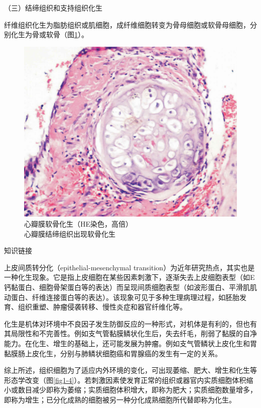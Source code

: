 {（三）结缔组织和支持组织化生}

纤维组织化生为脂肪组织或肌细胞，成纤维细胞转变为骨母细胞或软骨母细胞，分别化生为骨或软骨（图\ref{fig1-3}）。
\begin{figure}[!htbp]
	\centering
    \includegraphics{./images/Image00004.jpg}
	\caption{心瓣膜软骨化生（HE染色，高倍） \\ {\small 心瓣膜结缔组织出现软骨化生}}
	\label{fig1-3} 
	\end{figure} 

{知识链接}

上皮间质转分化（epithelial-mesenchymal
transition）为近年研究热点，其实也是一种化生现象。它是指上皮细胞在某些因素刺激下，逐渐失去上皮细胞表型（如E钙黏蛋白、细胞骨架蛋白等的表达）而呈现间质细胞表型（如波形蛋白、平滑肌肌动蛋白、纤维连接蛋白等的表达）。该现象可见于多种生理病理过程，如胚胎发育、组织重塑、肿瘤侵袭转移、慢性炎症和器官纤维化等。

化生是机体对环境中不良因子发生防御反应的一种形式，对机体是有利的，但也有其局限性和不完善性。例如支气管黏膜鳞状化生后，失去纤毛，削弱了黏膜的自净能力。在化生、增生的基础上，还可能发展为肿瘤。例如支气管鳞状上皮化生和胃黏膜肠上皮化生，分别与肺鳞状细胞癌和胃腺癌的发生有一定的关系。

综上所述，组织细胞为了适应内外环境的变化，可出现萎缩、肥大、增生和化生等形态学改变（图\ref{fig1-4}）。若刺激因素使发育正常的组织或器官内实质细胞体积缩小或数目减少即称为萎缩；实质细胞体积增大，即称为肥大；实质细胞数量增多，即称为增生；已分化成熟的细胞被另一种分化成熟细胞所代替即称为化生。

